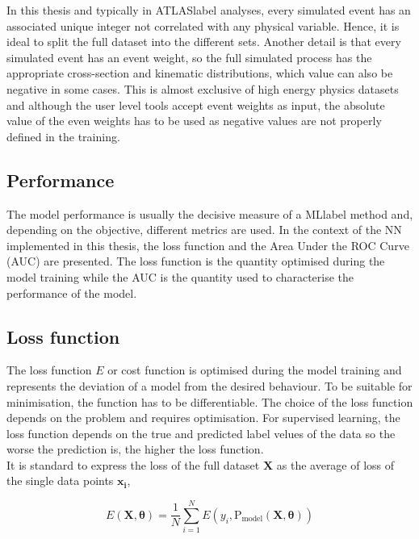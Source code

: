In this thesis and typically in \acrshort{ATLASlabel} analyses, every simulated event has an associated unique integer not correlated with any physical variable. Hence, it is ideal to split the full dataset into the different sets. Another detail is that every simulated event has an event weight, so the full simulated process has the appropriate cross-section and kinematic distributions, which value can also be negative in some cases. This is almost exclusive of high energy physics datasets and although the user level tools accept event weights as input, the absolute value of the even weights has to be used as negative values are not properly defined in the training. 

\subsection{Performance}

The model performance is usually the decisive measure of a \acrshort{MLlabel} method and, depending on the objective, different metrics are used. In the context of the NN implemented in this thesis, the loss function and the Area Under the ROC Curve (AUC) are presented. The loss function is the quantity optimised during the model training while the AUC is the quantity used to characterise the performance of the model.

\subsection{Loss function}

The loss function $E$ or cost function is optimised during the model training and represents the deviation of a model from the desired behaviour. To be suitable for minimisation, the function has to be differentiable. The choice of the loss function depends on the problem and requires optimisation. For supervised learning, the loss function depends on the true and predicted label velues of the data so the worse the prediction is, the higher the loss function.\\

It is standard to express the loss of the full dataset $\mathbf{X}$ as the average of loss of the single data points $\mathbf{x_i}$,

\begin{equation}
    E(\mathbf{X},\boldsymbol{\theta})=\frac{1}{N}\sum_{i=1}^NE(y_i,\text{P}_\text{model}(\mathbf{X},\boldsymbol{\theta}))
\end{equation}

